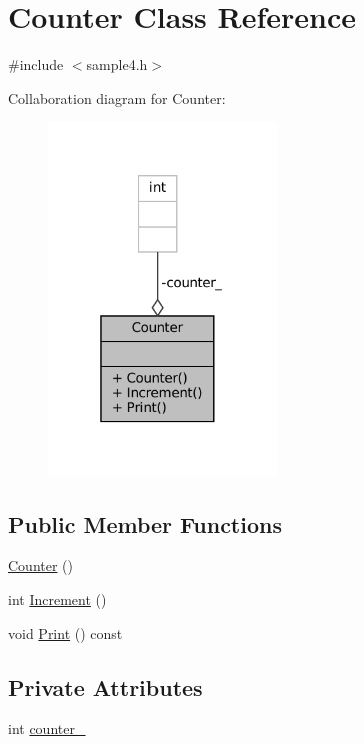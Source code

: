\hypertarget{classCounter}{}\section{Counter Class Reference}
\label{classCounter}


{\ttfamily \#include $<$sample4.\+h$>$}



Collaboration diagram for Counter\+:
\nopagebreak
\begin{figure}[H]
\begin{center}
\leavevmode
\includegraphics[width=172pt]{classCounter__coll__graph}
\end{center}
\end{figure}
\subsection*{Public Member Functions}
\begin{DoxyCompactItemize}
\item 
\hyperlink{classCounter_a1e05f69b5240fbab3e7ab351672167f0}{Counter} ()
\item 
int \hyperlink{classCounter_a0a0ca9fdb580a2aec9a5a62ebed2b5ab}{Increment} ()
\item 
void \hyperlink{classCounter_a80092ec2a0deea0870b2e9f8ad0906bd}{Print} () const
\end{DoxyCompactItemize}
\subsection*{Private Attributes}
\begin{DoxyCompactItemize}
\item 
int \hyperlink{classCounter_abdef0bf73f0a68177863c42c6eba2fc0}{counter\+\_\+}
\end{DoxyCompactItemize}


